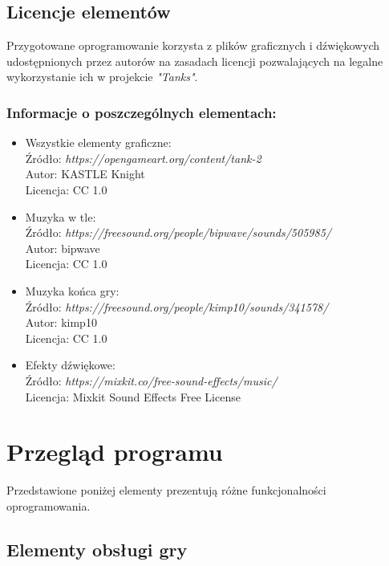 \documentclass[11pt,a4paper]{report}
\begin{document}
\subsection {Licencje elementów}
Przygotowane oprogramowanie korzysta z plików graficznych i dźwiękowych udostępnionych przez autorów na zasadach licencji pozwalających na legalne wykorzystanie ich w projekcie \textsl{"Tanks"}.
\subsubsection{Informacje o poszczególnych elementach:}
\begin {itemize}
\item{Wszystkie elementy graficzne:}\\
Źródło: \textsl{https://opengameart.org/content/tank-2}\\
Autor: KASTLE Knight\\
Licencja: CC 1.0
\item{Muzyka w tle: }\\
Źródło: \textsl{https://freesound.org/people/bipwave/sounds/505985/}\\
Autor: bipwave\\
Licencja: CC 1.0
\item{Muzyka końca gry:}\\
Źródło: \textsl{https://freesound.org/people/kimp10/sounds/341578/}\\
Autor: kimp10\\
Licencja: CC 1.0
\item{Efekty dźwiękowe:}\\
Źródło: \textsl{https://mixkit.co/free-sound-effects/music/}\\
Licencja: Mixkit Sound Effects Free License
\end {itemize}
\newpage

\section{Przegląd programu}\label{sec:teskt}
Przedstawione poniżej elementy prezentują różne funkcjonalności oprogramowania.
\subsection {Elementy obsługi gry}
\end{document}
